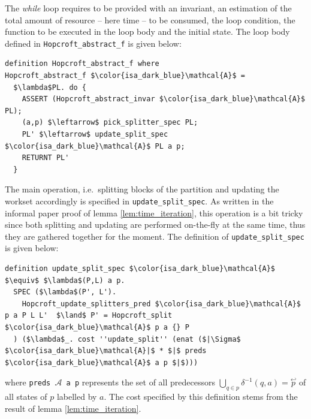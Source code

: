\documentclass[12pt, a4 paper]{article}
\newcommand{\edmargin}[2]{\marginpar{\raggedright\linespread{.7}\tiny #1: #2}}
\theoremstyle{definition}
\begin{document}
The \textit{while} loop requires to be provided with an invariant, an estimation\edmargin{VT}{To be detailed} of the total amount of resource -- here time -- to be consumed, the loop condition, the function to be executed in the loop body and the initial state.
The loop body defined in \texttt{Hopcroft\_abstract\_f} is given below:
\begin{lstlisting}[language=Isabelle]
definition Hopcroft_abstract_f where
Hopcroft_abstract_f $\color{isa_dark_blue}\mathcal{A}$ = 
  $\lambda$PL. do {
    ASSERT (Hopcroft_abstract_invar $\color{isa_dark_blue}\mathcal{A}$ PL);                             
    (a,p) $\leftarrow$ pick_splitter_spec PL;
    PL' $\leftarrow$ update_split_spec $\color{isa_dark_blue}\mathcal{A}$ PL a p;
    RETURNT PL'
  }
\end{lstlisting}
The main operation, i.e.\ splitting blocks of the partition and updating the workset accordingly is specified in \texttt{update\_split\_spec}.
As written in the informal paper proof of lemma \ref{lem:time_iteration}, this operation is a bit tricky since both splitting and updating are performed on-the-fly at the same time, thus they are gathered together for the moment.
The definition of \texttt{update\_split\_spec} is given below:
\begin{lstlisting}[language=Isabelle]
definition update_split_spec $\color{isa_dark_blue}\mathcal{A}$ $\equiv$ $\lambda$(P,L) a p.
  SPEC ($\lambda$(P', L').
    Hopcroft_update_splitters_pred $\color{isa_dark_blue}\mathcal{A}$ p a P L L'  $\land$ P' = Hopcroft_split $\color{isa_dark_blue}\mathcal{A}$ p a {} P
  ) ($\lambda$_. cost ''update_split'' (enat ($|\Sigma$ $\color{isa_dark_blue}\mathcal{A}|$ * $|$ preds $\color{isa_dark_blue}\mathcal{A}$ a p $|$)))
\end{lstlisting}
where \texttt{preds $\mathcal{A}$ a p} represents the set of all predecessors $\bigcup_{q \in p} \delta^{-1}(q, a) = \overset{\hookleftarrow}{p}$ of all states of $p$ labelled by $a$. The cost specified by this definition stems from the result of lemma \ref{lem:time_iteration}.



% 

\pagebreak


\end{document}

